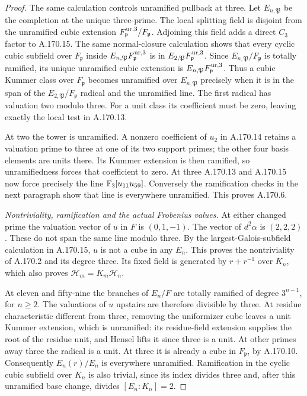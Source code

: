 \begin{proof}
The same calculation controls unramified pullback at three.
Let \(E_{n,\mathfrak P}\) be the completion at the unique three-prime.
The local splitting field is disjoint from the unramified cubic
extension \(F_{\mathfrak p}^{\rm ur,3}/F_{\mathfrak p}\).
Adjoining this field adds a direct \(C_3\) factor to A.170.15.
The same normal-closure calculation shows that every cyclic cubic
subfield over \(F_{\mathfrak p}\) inside
\(E_{n,\mathfrak P}F_{\mathfrak p}^{\rm ur,3}\) is in
\(E_{2,\mathfrak P}F_{\mathfrak p}^{\rm ur,3}\).
Since \(E_{n,\mathfrak P}/F_{\mathfrak p}\) is totally ramified,
its unique unramified cubic extension is
\(E_{n,\mathfrak P}F_{\mathfrak p}^{\rm ur,3}\).
Thus a cubic Kummer class over \(F_{\mathfrak p}\) becomes unramified
over \(E_{n,\mathfrak P}\) precisely when it is in the span of the
\(E_{2,\mathfrak P}/F_{\mathfrak p}\) radical and the unramified line.
The first radical has valuation two modulo three.
For a unit class its coefficient must be zero, leaving exactly
the local test in A.170.13.

At two the tower is unramified.  A nonzero coefficient of \(u_2\)
in A.170.14 retains a valuation prime to three at one of its two
support primes; the other four basis elements are units there.
Its Kummer extension is then ramified, so unramifiedness forces
that coefficient to zero.  At three A.170.13 and A.170.15 now
force precisely the line \(\mathbb F_3[u_{11}u_{59}]\).
Conversely the ramification checks in the next paragraph show
that line is everywhere unramified.  This proves A.170.6.

\emph{Nontriviality, ramification and the actual Frobenius values.}
At either changed prime the valuation vector of \(u\) in \(F\)
is \((0,1,-1)\).  The vector of \(d^2\alpha\) is \((2,2,2)\).
These do not span the same line modulo three.
By the largest-Galois-subfield calculation in A.170.15,
\(u\) is not a cube in any \(E_n\).  This proves the
nontriviality of A.170.2 and its degree three.
Its fixed field is generated by \(r+r^{-1}\) over \(K_n\),
which also proves \(\mathscr H_m=K_m\mathscr H_n\).

At eleven and fifty-nine the branches of \(E_n/F\) are totally
ramified of degree \(3^{n-1}\), for \(n\ge2\).
The valuations of \(u\) upstairs are therefore divisible by three.
At residue characteristic different from three, removing the
uniformizer cube leaves a unit Kummer extension, which is
unramified: its residue-field extension supplies the root of the
residue unit, and Hensel lifts it since three is a unit.
At other primes away three the radical is a unit.
At three it is already a cube in \(F_{\mathfrak p}\), by A.170.10.
Consequently \(E_n(r)/E_n\) is everywhere unramified.
Ramification in the cyclic cubic subfield over \(K_n\) is also
trivial, since its index divides three and, after this unramified
base change, divides \([E_n:K_n]=2\).


\end{proof}
